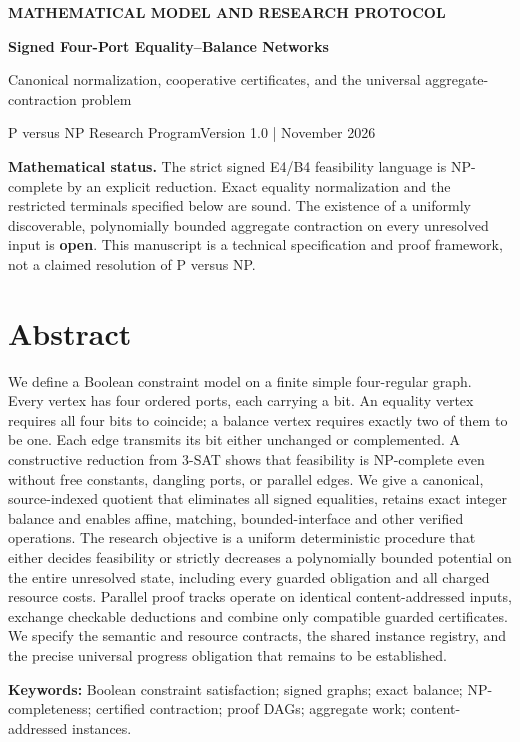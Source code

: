 \documentclass[11pt,letterpaper]{article}
\theoremstyle{definition}
\begin{document}
\thispagestyle{empty}
{\small\sffamily\bfseries\color{teal} MATHEMATICAL MODEL AND RESEARCH PROTOCOL}\par
\vspace{0.45em}
{\color{ink}\LARGE\bfseries Signed Four-Port Equality--Balance Networks\par}
\vspace{0.35em}
{\large Canonical normalization, cooperative certificates, and the universal aggregate-contraction problem\par}
\vspace{0.65em}
{\sffamily\small P versus NP Research Program\hfill Version 1.0 \enspace| November 2026\par}
\vspace{0.7em}
\noindent\colorbox{pale}{\parbox{\dimexpr\linewidth-2\fboxsep\relax}{\small\textbf{Mathematical status.} The strict signed E4/B4 feasibility language is NP-complete by an explicit reduction. Exact equality normalization and the restricted terminals specified below are sound. The existence of a uniformly discoverable, polynomially bounded aggregate contraction on every unresolved input is \textbf{open}. This manuscript is a technical specification and proof framework, not a claimed resolution of P versus NP.}}
\section*{Abstract}
We define a Boolean constraint model on a finite simple four-regular graph. Every vertex has four ordered ports, each carrying a bit. An equality vertex requires all four bits to coincide; a balance vertex requires exactly two of them to be one. Each edge transmits its bit either unchanged or complemented. A constructive reduction from 3-SAT shows that feasibility is NP-complete even without free constants, dangling ports, or parallel edges. We give a canonical, source-indexed quotient that eliminates all signed equalities, retains exact integer balance and enables affine, matching, bounded-interface and other verified operations. The research objective is a uniform deterministic procedure that either decides feasibility or strictly decreases a polynomially bounded potential on the entire unresolved state, including every guarded obligation and all charged resource costs. Parallel proof tracks operate on identical content-addressed inputs, exchange checkable deductions and combine only compatible guarded certificates. We specify the semantic and resource contracts, the shared instance registry, and the precise universal progress obligation that remains to be established.\par
{\small\textbf{Keywords:} Boolean constraint satisfaction; signed graphs; exact balance; NP-completeness; certified contraction; proof DAGs; aggregate work; content-addressed instances.}
\vspace{0.55em}
\clearpage
{\small\tableofcontents}
\vspace{0.5em}
\end{document}
